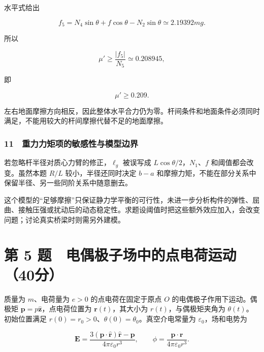 \documentclass[12pt,a4paper,fontset=fandol]{ctexart}
\begin{document}
水平式给出

\[f_5=N_4\sin\theta+f\cos\theta-N_2\sin\theta
\simeq2.19392mg.\]

所以

\[\mu'\ge\frac{|f_5|}{N_5}\simeq0.208945,\]

即

\[\boxed{\mu'\ge0.209.}\]

左右地面摩擦方向相反，因此整体水平合力仍为零。杆间条件和地面条件必须同时满足，不能用较大的杆间摩擦代替不足的地面摩擦。

\subsubsection{11　重力力矩项的敏感性与模型边界}\label{ux91cdux529bux529bux77e9ux9879ux7684ux654fux611fux6027ux4e0eux6a21ux578bux8fb9ux754c}

若忽略杆半径对质心力臂的修正，\(\ell_g\) 被误写成
\(L\cos\theta/2\)，\(N_1\)、\(f\) 和阈值都会改变。虽然本题 \(R/L\)
较小，半径还同时决定 \(b-a\)
和摩擦力矩，不能在部分关系中保留半径、另一些同阶关系中随意删去。

这个模型的``足够摩擦''只保证静力学平衡的可行性，未进一步分析构件的弹性、屈曲、接触压强或扰动后的动态稳定性。求题设阈值时把这些额外效应加入，会改变问题；讨论真实桥梁时则需另外建模。

\clearpage

\section{第 5
题　电偶极子场中的点电荷运动（40分）}\label{ux7b2c-5-ux9898-ux7535ux5076ux6781ux5b50ux573aux4e2dux7684ux70b9ux7535ux8377ux8fd0ux52a840ux5206}

质量为 \(m\)、电荷量为 \(e>0\) 的点电荷在固定于原点 \(O\)
的电偶极子作用下运动。偶极矩
\(\boldsymbol p=p\hat{\boldsymbol z}\)，点电荷位置为
\(\boldsymbol r(t)\)，其大小为 \(r(t)\)，与偶极矩夹角为
\(\theta(t)\)。初始位置满足
\(r(0)=r_0>0\)、\(\theta(0)=\theta_0\)。真空介电常量为
\(\varepsilon_0\)，场和电势为

\[\boldsymbol E=\frac{3(\boldsymbol p\cdot\hat{\boldsymbol r})\hat{\boldsymbol r}-\boldsymbol p}
{4\pi\varepsilon_0r^3},\qquad
\phi=\frac{\boldsymbol p\cdot\boldsymbol r}{4\pi\varepsilon_0r^3}.\]
\end{document}
